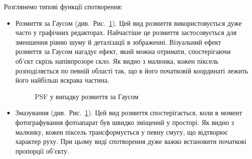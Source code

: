 \documentclass{diploma}
\begin{document}
      Розглянемо типові функції спотворення:
      \begin{itemize}
        \item Розмиття за Гаусом (див.~Рис.~\ref{fig:gaussian-blur}).
          Цей вид розмиття використовується дуже часто у графічних редакторах.
          Найчастіше це розмиття застосовується для зменшення рівню шуму й
          деталізації в зображенні.
          Візуальний ефект розмиття за Гаусом нагадує ефект, який можна
          отримати, спостерігаючи об’єкт скрізь напівпрозоре скло.
          Як видно з малюнка, кожен піксель розподіляється по певній області
          так, що в його початковій координаті лежить його найбільш яскрава
          частина.
          \begin{figure}[ht!]
            \hfill
            \caption{PSF у випадку розмиття за Гаусом}
            \label{fig:gaussian-blur}
          \end{figure}
        \item Змазування (див.~Рис.~\ref{fig:gaussian-blur}).
          Цей вид розмиття спостерігається, коли в момент фотографування
          фотоапарат був швидко зміщений у просторі.
          Як видно з малюнку, кожен піксель трансформується у певну смугу, що
          відтворює характер руху.
          При цьому виді спотворення дуже важко встановити початкові пропорції
          об’єкту.
          \begin{figure}[ht!]
\end{figure}
\end{itemize}
\end{document}
